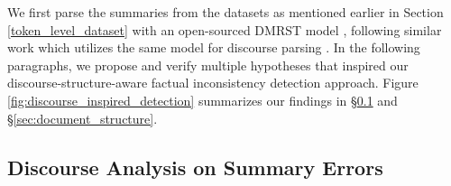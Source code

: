 We first parse the summaries from the datasets as mentioned earlier in Section \ref{token_level_dataset} with an open-sourced DMRST model \cite{liu-etal-2021-dmrst}, following similar work which utilizes the same model for discourse parsing \cite{adams-etal-2023-generating,pu-etal-2023-incorporating, kim2024threads}. In the following paragraphs, we propose and verify multiple hypotheses that inspired our discourse-structure-aware factual inconsistency detection approach. Figure \ref{fig:discourse_inspired_detection} summarizes our findings in \S \ref{sec:summary_error_analysis} and \S \ref{sec:document_structure}.


\subsection{Discourse Analysis on Summary Errors}\label{sec:summary_error_analysis}

